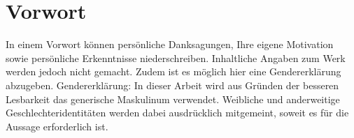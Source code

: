 
\clearpage
\chapter*{Vorwort}
In einem Vorwort können persönliche Danksagungen, Ihre eigene Motivation sowie persönliche Erkenntnisse niederschreiben. 
Inhaltliche Angaben zum Werk werden jedoch nicht gemacht. Zudem ist es möglich hier eine Gendererklärung abzugeben.
Gendererklärung:
In dieser Arbeit wird aus Gründen der besseren Lesbarkeit das generische Maskulinum verwendet. 
Weibliche und anderweitige Geschlechteridentitäten werden dabei ausdrücklich mitgemeint, soweit es für die Aussage erforderlich ist.
